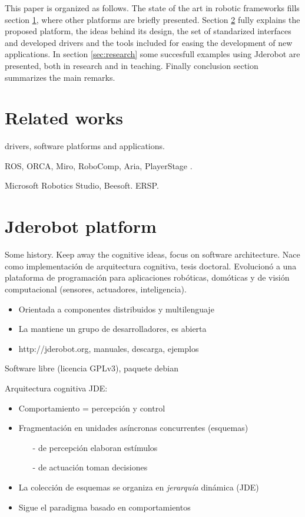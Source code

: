 \documentclass[twocolumn]{svjour3}          %
\begin{document}
This paper is organized as follows. The state of the art in robotic frameworks fills section \ref{sec:relatedworks}, where other platforms are briefly presented. Section \ref{sec:jderobot} fully explains the proposed platform, the ideas behind its design, the set of standarized interfaces and developed drivers and the tools included for easing the development of new applications. In section \ref{sec:research} some succesfull examples using Jderobot are presented, both in research and in teaching. Finally conclusion section summarizes the main remarks.

\section{Related works}
\label{sec:relatedworks}

drivers, software platforms and applications.

ROS, ORCA, Miro, RoboComp, Aria, PlayerStage \cite{Gerkey03,vaughan2007}.

Microsoft Robotics Studio, Beesoft. ERSP.

\section{Jderobot platform}
\label{sec:jderobot}

Some history. Keep away the cognitive ideas, focus on software architecture. Nace como implementación de arquitectura cognitiva, tesis doctoral. Evolucionó a una plataforma de programación para aplicaciones robóticas, domóticas y de visión computacional (sensores, actuadores, inteligencia).

\begin{itemize}
\item Orientada a componentes distribuidos y multilenguaje
\item La mantiene un grupo de desarrolladores, es abierta
\item {http://jderobot.org}, manuales, descarga, ejemplos
\end{itemize}
Software libre (licencia GPLv3), paquete debian


Arquitectura cognitiva JDE:
\begin{itemize}
\item Comportamiento = {percepción} y {control}
\item Fragmentación en unidades asíncronas concurrentes (esquemas)
\begin{itemize}
\item[-] de percepción elaboran estímulos
\item[-] de actuación toman decisiones
\end{itemize}
\item La colección de esquemas se organiza en \textit{jerarquía} dinámica (JDE)
\item Sigue el paradigma basado en comportamientos
\end{itemize}
\end{document}
